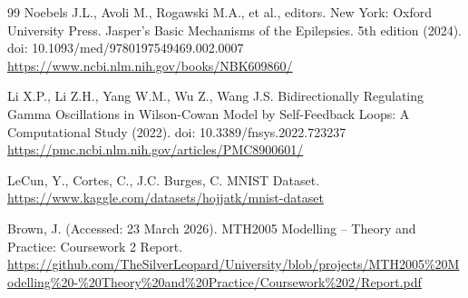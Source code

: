 \documentclass[10pt]{article}
\begin{document}
\begin{flushleft}
\begin{thebibliography}{99}
Noebels J.L., Avoli M., Rogawski M.A., et al., editors.
New York: Oxford University Press. Jasper's Basic Mechanisms of the Epilepsies. 5th edition (2024). doi: 10.1093/med/9780197549469.002.0007
\url{https://www.ncbi.nlm.nih.gov/books/NBK609860/}

Li X.P., Li Z.H., Yang W.M., Wu Z., Wang J.S. Bidirectionally Regulating Gamma Oscillations in Wilson-Cowan Model by Self-Feedback Loops: A Computational Study (2022). doi: 10.3389/fnsys.2022.723237
\url{https://pmc.ncbi.nlm.nih.gov/articles/PMC8900601/}

LeCun, Y., Cortes, C., J.C. Burges, C. MNIST Dataset.
\url{https://www.kaggle.com/datasets/hojjatk/mnist-dataset}


Brown, J. (Accessed: 23 March 2026). MTH2005 Modelling – Theory and Practice: Coursework 2 Report.  
\url{https://github.com/TheSilverLeopard/University/blob/projects/MTH2005%20Modelling%20-%20Theory%20and%20Practice/Coursework%202/Report.pdf}

\end{thebibliography}
\end{flushleft}


\end{document}
